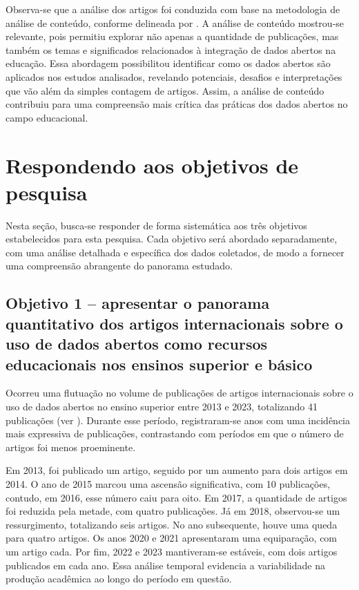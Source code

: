 \documentclass[portuguese]{textolivre}
\begin{document}
Observa-se que a análise dos artigos foi conduzida com base na metodologia de análise de conteúdo, conforme delineada por \textcite{krippendorff1980}. A análise de conteúdo mostrou-se relevante, pois permitiu explorar não apenas a quantidade de publicações, mas também os temas e significados relacionados à integração de dados abertos na educação. Essa abordagem possibilitou identificar como os dados abertos são aplicados nos estudos analisados, revelando potenciais, desafios e interpretações que vão além da simples contagem de artigos. Assim, a análise de conteúdo contribuiu para uma compreensão mais crítica das práticas dos dados abertos no campo educacional.

\section{Respondendo aos objetivos de pesquisa}\label{sec-fmt-manuscrito}
Nesta seção, busca-se responder de forma sistemática aos três objetivos estabelecidos para esta pesquisa. Cada objetivo será abordado separadamente, com uma análise detalhada e específica dos dados coletados, de modo a fornecer uma compreensão abrangente do panorama estudado.


\subsection{Objetivo 1 – apresentar o panorama quantitativo dos artigos internacionais sobre o uso de dados abertos como recursos educacionais nos ensinos superior e básico}\label{sec-formato}
Ocorreu uma flutuação no volume de publicações de artigos internacionais sobre o uso de dados abertos no ensino superior entre 2013 e 2023, totalizando 41 publicações (ver ). Durante esse período, registraram-se anos com uma incidência mais expressiva de publicações, contrastando com períodos em que o número de artigos foi menos proeminente. 

Em 2013, foi publicado um artigo, seguido por um aumento para dois artigos em 2014. O ano de 2015 marcou uma ascensão significativa, com 10 publicações, contudo, em 2016, esse número caiu para oito. Em 2017, a quantidade de artigos foi reduzida pela metade, com quatro publicações. Já em 2018, observou-se um ressurgimento, totalizando seis artigos. No ano subsequente, houve uma queda para quatro artigos. Os anos 2020 e 2021 apresentaram uma equiparação, com um artigo cada. Por fim, 2022 e 2023 mantiveram-se estáveis, com dois artigos publicados em cada ano. Essa análise temporal evidencia a variabilidade na produção acadêmica ao longo do período em questão.  
\end{document}
